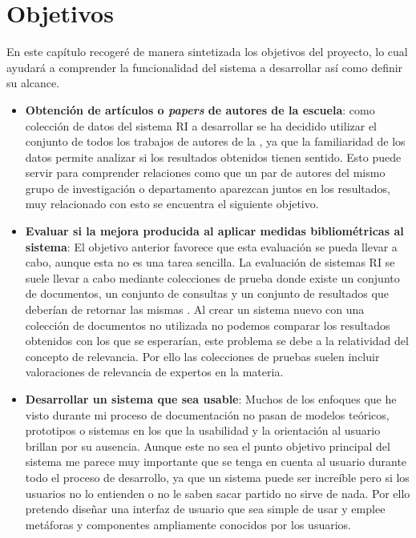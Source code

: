 \chapter{Objetivos}

En este capítulo recogeré de manera sintetizada los objetivos del proyecto, lo cual ayudará a comprender la funcionalidad del sistema a desarrollar así como definir su alcance.

\begin{itemize}
	\item \textbf{Obtención de artículos o \textit{papers} de autores de la escuela}: como colección de datos del sistema \acrshort{RI} a desarrollar se ha decidido utilizar el conjunto de todos los trabajos de autores de la \myFaculty, ya que la familiaridad de los datos permite analizar si los resultados obtenidos tienen sentido. Esto puede servir para comprender relaciones como que un par de autores del mismo grupo de investigación o departamento aparezcan juntos en los resultados, muy relacionado con esto se encuentra el siguiente objetivo.
	\item \textbf{Evaluar si la mejora producida al aplicar medidas bibliométricas al sistema}: El objetivo anterior favorece que esta evaluación se pueda llevar a cabo, aunque esta no es una tarea sencilla. La evaluación de sistemas \acrshort{RI} se suele llevar a cabo mediante colecciones de prueba donde existe un conjunto de documentos, un conjunto de consultas y un conjunto de resultados que deberían de retornar las mismas  \cite{RI_Evaluation}. Al crear un sistema nuevo con una colección de documentos no utilizada no podemos comparar los resultados obtenidos con los que se esperarían, este problema se debe a la relatividad del concepto de relevancia. Por ello las colecciones de pruebas suelen incluir valoraciones de relevancia de expertos en la materia.
	\item \textbf{Desarrollar un sistema que sea usable}: Muchos de los enfoques que he visto durante mi proceso de documentación no pasan de modelos teóricos, prototipos o sistemas en los que la usabilidad y la orientación al usuario brillan por su ausencia. Aunque este no sea el punto objetivo principal del sistema me parece muy importante que se tenga en cuenta al usuario durante todo el proceso de desarrollo, ya que un sistema puede ser increíble pero si los usuarios no lo entienden o no le saben sacar partido no sirve de nada. Por ello pretendo diseñar una interfaz de usuario que sea simple de usar y emplee metáforas y componentes ampliamente conocidos por los usuarios.

\end{itemize}
